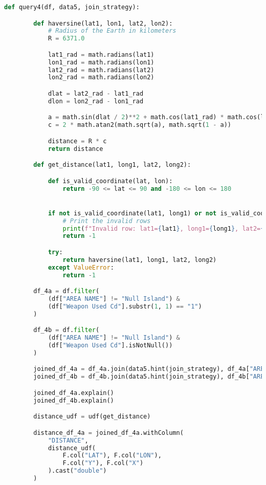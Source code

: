 \documentclass{article}
\begin{document}
\begin{lstlisting}[language = Python]
    def query4(df, data5, join_strategy):

        def haversine(lat1, lon1, lat2, lon2):
            # Radius of the Earth in kilometers
            R = 6371.0

            lat1_rad = math.radians(lat1)
            lon1_rad = math.radians(lon1)
            lat2_rad = math.radians(lat2)
            lon2_rad = math.radians(lon2)

            dlat = lat2_rad - lat1_rad
            dlon = lon2_rad - lon1_rad

            a = math.sin(dlat / 2)**2 + math.cos(lat1_rad) * math.cos(lat2_rad) * math.sin(dlon / 2)**2
            c = 2 * math.atan2(math.sqrt(a), math.sqrt(1 - a))

            distance = R * c
            return distance

        def get_distance(lat1, long1, lat2, long2):

            def is_valid_coordinate(lat, lon):
                return -90 <= lat <= 90 and -180 <= lon <= 180


            if not is_valid_coordinate(lat1, long1) or not is_valid_coordinate(lat2, long2):
                # Print the invalid rows
                print(f"Invalid row: lat1={lat1}, long1={long1}, lat2={lat2}, long2={long2}")
                return -1

            try:
                return haversine(lat1, long1, lat2, long2)
            except ValueError:
                return -1

        df_4a = df.filter(
            (df["AREA NAME"] != "Null Island") &
            (df["Weapon Used Cd"].substr(1, 1) == "1")
        )

        df_4b = df.filter(
            (df["AREA NAME"] != "Null Island") &
            (df["Weapon Used Cd"].isNotNull())
        )

        joined_df_4a = df_4a.join(data5.hint(join_strategy), df_4a["AREA"] == data5["PREC"])
        joined_df_4b = df_4b.join(data5.hint(join_strategy), df_4b["AREA"] == data5["PREC"])

        joined_df_4a.explain()
        joined_df_4b.explain()

        distance_udf = udf(get_distance)

        distance_df_4a = joined_df_4a.withColumn(
            "DISTANCE",
            distance_udf(
                F.col("LAT"), F.col("LON"),
                F.col("Y"), F.col("X")
            ).cast("double")
        )


\end{lstlisting}
\end{document}
